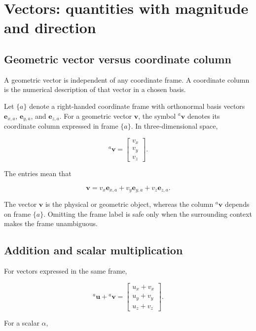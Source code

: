 \documentclass[
  australian,
  12pt,
  letterpaper,
  DIV=11,
  numbers=noendperiod,
  twoside]{scrreprt}
\begin{document}
\section{Vectors: quantities with magnitude and
direction}\label{vectors-quantities-with-magnitude-and-direction}

\subsection{Geometric vector versus coordinate
column}\label{geometric-vector-versus-coordinate-column}

A geometric vector is independent of any coordinate frame. A coordinate
column is the numerical description of that vector in a chosen basis.

Let \(\{a\}\) denote a right-handed coordinate frame with orthonormal
basis vectors \(\mathbf{e}_{x,a}\), \(\mathbf{e}_{y,a}\), and
\(\mathbf{e}_{z,a}\). For a geometric vector \(\mathbf{v}\), the symbol
\({}^{a}\mathbf{v}\) denotes its coordinate column expressed in frame
\(\{a\}\). In three-dimensional space,

\[
{}^{a}\mathbf{v}
=
\begin{bmatrix}
v_x \\
v_y \\
v_z
\end{bmatrix}.
\]

The entries mean that

\[
\mathbf{v}
=
v_x\mathbf{e}_{x,a}
+v_y\mathbf{e}_{y,a}
+v_z\mathbf{e}_{z,a}.
\]

The vector \(\mathbf{v}\) is the physical or geometric object, whereas
the column \({}^{a}\mathbf{v}\) depends on frame \(\{a\}\). Omitting the
frame label is safe only when the surrounding context makes the frame
unambiguous.

\subsection{Addition and scalar
multiplication}\label{addition-and-scalar-multiplication}

For vectors expressed in the same frame,

\[
{}^{a}\mathbf{u}
+{}^{a}\mathbf{v}
=
\begin{bmatrix}
u_x+v_x \\
u_y+v_y \\
u_z+v_z
\end{bmatrix}.
\]

For a scalar \(\alpha\),
\end{document}
